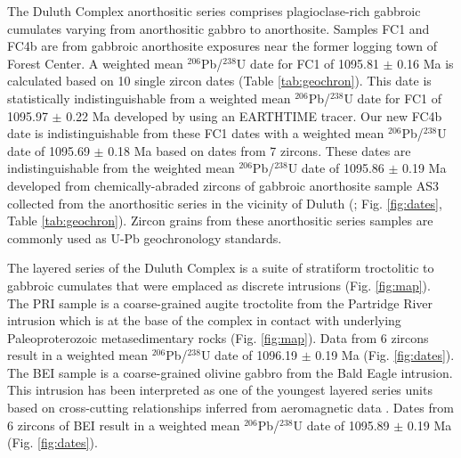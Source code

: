 \documentclass[11pt,letterpaper]{article}
\begin{document}
The Duluth Complex anorthositic series comprises plagioclase-rich gabbroic cumulates varying from anorthositic gabbro to anorthosite. Samples FC1 and FC4b are from gabbroic anorthosite exposures near the former logging town of Forest Center. A weighted mean $^{206}$Pb/$^{238}$U date for FC1 of 1095.81 $\pm$ 0.16 Ma is calculated based on 10 single zircon dates (Table \ref{tab:geochron}). This date is statistically indistinguishable from a weighted mean $^{206}$Pb/$^{238}$U date for FC1 of 1095.97 $\pm$ 0.22 Ma developed by \cite{Ibanez-Mejia2019a} using an EARTHTIME tracer. Our new FC4b date is indistinguishable from these FC1 dates with a weighted mean $^{206}$Pb/$^{238}$U date of 1095.69 $\pm$ 0.18 Ma based on dates from 7 zircons. These dates are indistinguishable from the weighted mean $^{206}$Pb/$^{238}$U date of 1095.86 $\pm$ 0.19 Ma developed from chemically-abraded zircons of gabbroic anorthosite sample AS3 collected from the anorthositic series in the vicinity of Duluth (\citealp{Schoene2006a}; Fig. \ref{fig:dates}, Table \ref{tab:geochron}). Zircon grains from these anorthositic series samples are commonly used as U-Pb geochronology standards.

The layered series of the Duluth Complex is a suite of stratiform troctolitic to gabbroic cumulates that were emplaced as discrete intrusions (Fig. \ref{fig:map}). The PRI sample is a coarse-grained augite troctolite from the Partridge River intrusion which is at the base of the complex in contact with underlying Paleoproterozoic metasedimentary rocks (Fig. \ref{fig:map}). Data from 6 zircons result in a weighted mean $^{206}$Pb/$^{238}$U date of 1096.19 $\pm$ 0.19 Ma (Fig. \ref{fig:dates}). The BEI sample is a coarse-grained olivine gabbro from the Bald Eagle intrusion. This intrusion has been interpreted as one of the youngest layered series units based on cross-cutting relationships inferred from aeromagnetic data \citep{Miller2002c}. Dates from 6 zircons of BEI result in a weighted mean $^{206}$Pb/$^{238}$U date of 1095.89 $\pm$ 0.19 Ma (Fig. \ref{fig:dates}).
\end{document}

